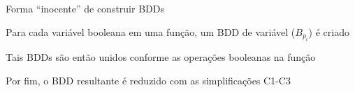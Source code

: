 \expandafter\documentclass\expandafter[table, usenames, svgnames, dvipsnames,14pt, \classopts]{beamer}
\begin{document}
\begin{frame}{Forma ``inocente'' de construir \uppercase{BDD}s}

    \begin{outline}[enumerate]
        \1 Para cada variável booleana em uma função, um BDD de variável ($B_{p_i}$) é criado
        
        \vspace{1em}
        
        \1 Tais BDDs são então unidos conforme as operações booleanas na função
        
        \vspace{1em}
        
        \1 Por fim, o BDD resultante é reduzido com as simplificações C1-C3
    \end{outline}

\end{frame}
\end{document}
